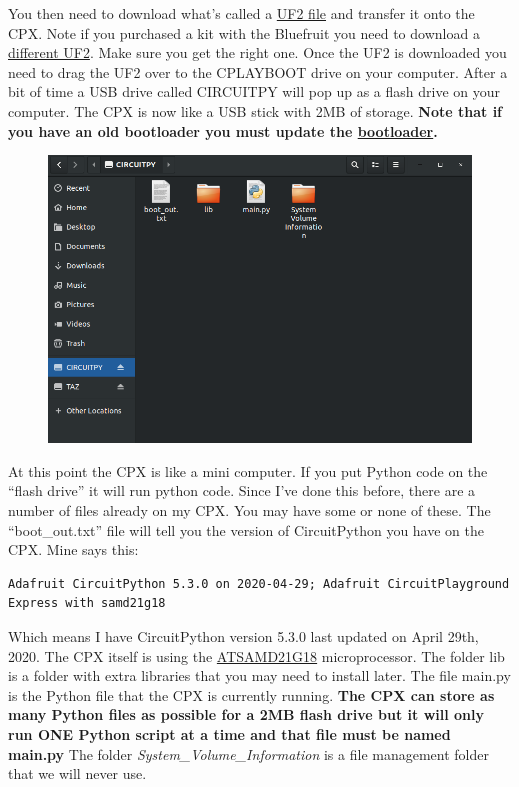 You then need to download what’s called a \href{https://circuitpython.org/board/circuitplayground_express/}{UF2 file} and transfer it
onto the CPX. Note if you purchased a kit with the Bluefruit you need
to download a
\href{https://circuitpython.org/board/circuitplayground_bluefruit/}{different
  UF2}. Make sure you get the right one. Once the 
UF2 is downloaded you need to drag the UF2 over to the CPLAYBOOT drive
on your computer. After a bit of time a USB drive called CIRCUITPY
will pop up as a flash drive on your computer. The CPX is now like a
USB stick with 2MB of storage. {\bf Note that if you have an old bootloader you must update the \href{https://learn.adafruit.com/adafruit-circuit-playground-bluefruit/update-bootloader-use-command-line}{bootloader}.}
\begin{figure}[H]
  \begin{center}
    \includegraphics[width=\textwidth]{Figures/CIRCUITPY.png}
  \end{center}
\end{figure}
At this point the CPX is like a mini computer. If you put Python code
on the “flash drive” it will run python code. Since I’ve done this
before, there are a number of files already on my CPX. You may have
some or none of these. The “boot\_out.txt” file will tell you the
version of CircuitPython you have on the CPX. Mine says this:
\begin{verbatim}
Adafruit CircuitPython 5.3.0 on 2020-04-29; Adafruit CircuitPlayground Express with samd21g18
\end{verbatim}
Which means I have CircuitPython version 5.3.0 last updated on April
29th, 2020. The CPX itself is using the \href{https://www.microchip.com/wwwproducts/en/ATsamd21g18}{ATSAMD21G18}
microprocessor. The folder lib is a folder with extra libraries that
you may need to install later. The file main.py is the Python file
that the CPX is currently running. {\bf The CPX can store as many Python
files as possible for a 2MB flash drive but it will only run ONE
Python script at a time and that file must be named main.py} The folder
{\it System\_Volume\_Information} is a file management folder that we will
never use.

